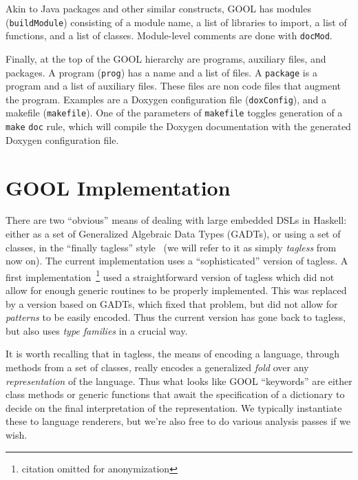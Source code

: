 \documentclass[sigplan,review,anonymous,prologue,dvipsnames]{acmart}
\newcommand{\Cplusplus}{C\texttt{++}}
\begin{document}
Akin to Java packages and other similar constructs, GOOL has modules
(\verb|buildModule|) consisting of a module name, a list of libraries to import,
a list of functions, and a list of classes. Module-level comments are done
with \verb|docMod|.

Finally, at the top of the GOOL hierarchy are programs, auxiliary files, and
packages. A program (\verb|prog|) has a name and a list of files.  A
\verb|package| is a program and a list of auxiliary files. These files are non
code files that augment the program. Examples are a Doxygen configuration file
(\verb|doxConfig|), and a makefile (\verb|makefile|).  One of the parameters of
\verb|makefile| toggles generation of a \verb|make| \verb|doc| rule, which will
compile the Doxygen documentation with the generated Doxygen configuration
file.

\section{GOOL Implementation} \label{sec:implementation}

There are two ``obvious'' means of dealing with large embedded DSLs in
Haskell: either as a set of Generalized Algebraic Data Types (GADTs), or
using a set of classes, in the ``finally tagless'' style~\cite{carette2009finally}
(we will refer to it as simply \emph{tagless} from now on).
The current implementation uses a ``sophisticated'' version of tagless. A
first implementation~\footnote{citation omitted for anonymization}
used a straightforward version of tagless
which did not allow for enough generic routines to be properly implemented.
This was replaced by a version based on GADTs, which fixed that problem, but
did not allow for \emph{patterns} to be easily encoded. Thus the current
version has gone back to tagless, but also uses \emph{type families} in a crucial
way.

It is worth recalling that in tagless, the means of encoding a language,
through methods from a set of classes, really encodes a generalized
\emph{fold} over any \emph{representation} of the language.  Thus what
looks like GOOL ``keywords'' are either class methods or generic functions
that await the specification of a dictionary to decide on the final
interpretation of the representation.  We typically instantiate these to
language renderers, but we're also free to do various analysis passes if
we wish.
\end{document}
